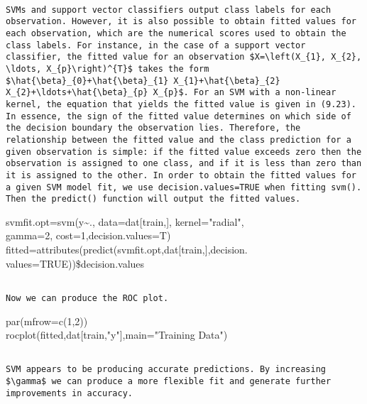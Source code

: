 \documentclass[10pt]{article}
\begin{document}
\begin{verbatim}

SVMs and support vector classifiers output class labels for each observation. However, it is also possible to obtain fitted values for each observation, which are the numerical scores used to obtain the class labels. For instance, in the case of a support vector classifier, the fitted value for an observation $X=\left(X_{1}, X_{2}, \ldots, X_{p}\right)^{T}$ takes the form $\hat{\beta}_{0}+\hat{\beta}_{1} X_{1}+\hat{\beta}_{2} X_{2}+\ldots+\hat{\beta}_{p} X_{p}$. For an SVM with a non-linear kernel, the equation that yields the fitted value is given in (9.23). In essence, the sign of the fitted value determines on which side of the decision boundary the observation lies. Therefore, the relationship between the fitted value and the class prediction for a given observation is simple: if the fitted value exceeds zero then the observation is assigned to one class, and if it is less than zero than it is assigned to the other. In order to obtain the fitted values for a given SVM model fit, we use decision.values=TRUE when fitting svm(). Then the predict() function will output the fitted values.
\end{verbatim}

\begin{displayquote}
svmfit.opt=svm(y\~{}., data=dat[train,], kernel="radial",\\
gamma=2, cost=1,decision.values=T)\\[0pt]
fitted=attributes(predict(svmfit.opt,dat[train,],decision.\\
values=TRUE))\$decision.values
\end{displayquote}

\begin{verbatim}

Now we can produce the ROC plot.
\end{verbatim}

\begin{displayquote}
par(mfrow=c(1,2))\\[0pt]
rocplot(fitted,dat[train,"y"],main="Training Data")
\end{displayquote}

\begin{verbatim}

SVM appears to be producing accurate predictions. By increasing $\gamma$ we can produce a more flexible fit and generate further improvements in accuracy.
\end{verbatim}
\end{document}
